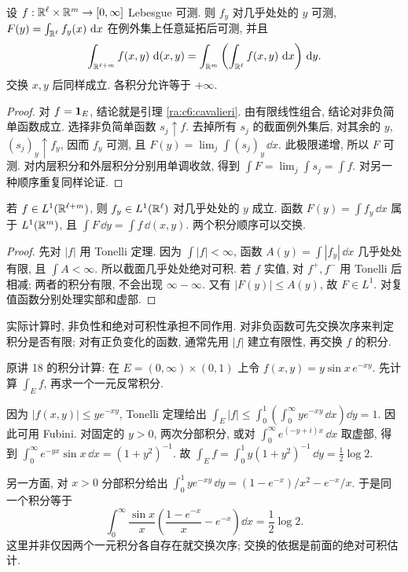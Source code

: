 \begin{theorem}\label{ra:c6:tonelli-euclid}
设 $f:\mathbb R^\ell\times\mathbb R^m\to[0,\infty]$ Lebesgue 可测. 则 $f_y$ 对几乎处处的 $y$ 可测, $F(y)=\int_{\mathbb R^\ell}f_y(x)\,\,\mathrm d x$ 在例外集上任意延拓后可测, 并且
\[
 \int_{\mathbb R^{\ell+m}}f(x,y)\,\,\mathrm d(x,y)
 =\int_{\mathbb R^m}\left(\int_{\mathbb R^\ell}f(x,y)\,\,\mathrm d x\right)\,\mathrm d y.
\]
交换 $x,y$ 后同样成立. 各积分允许等于 $+\infty$.
\end{theorem}
\begin{proof}
对 $f=\mathbf 1_E$, 结论就是引理 \ref{ra:c6:cavalieri}. 由有限线性组合, 结论对非负简单函数成立. 选择非负简单函数 $s_j\uparrow f$. 去掉所有 $s_j$ 的截面例外集后, 对其余的 $y$, $(s_j)_y\uparrow f_y$, 因而 $f_y$ 可测, 且
$F(y)=\lim_j\int(s_j)_y\,\dd x$. 此极限递增, 所以 $F$ 可测. 对内层积分和外层积分分别用单调收敛, 得到 $\int F=\lim_j\int s_j=\int f$. 对另一种顺序重复同样论证.
\end{proof}

\begin{theorem}\label{ra:c6:fubini-euclid}
若 $f\in L^1(\mathbb R^{\ell+m})$, 则 $f_y\in L^1(\mathbb R^\ell)$ 对几乎处处的 $y$ 成立. 函数 $F(y)=\int f_y\,\dd x$ 属于 $L^1(\mathbb R^m)$, 且 $\int F\,\dd y=\int f\,\dd(x,y)$. 两个积分顺序可以交换.
\end{theorem}
\begin{proof}
先对 $|f|$ 用 Tonelli 定理. 因为 $\int|f|<\infty$, 函数 $A(y)=\int|f_y|\,\dd x$ 几乎处处有限, 且 $\int A<\infty$. 所以截面几乎处处绝对可积. 若 $f$ 实值, 对 $f^+,f^-$ 用 Tonelli 后相减; 两者的积分有限, 不会出现 $\infty-\infty$. 又有 $|F(y)|\le A(y)$, 故 $F\in L^1$. 对复值函数分别处理实部和虚部.
\end{proof}

实际计算时, 非负性和绝对可积性承担不同作用. 对非负函数可先交换次序来判定积分是否有限; 对有正负变化的函数, 通常先用 $|f|$ 建立有限性, 再交换 $f$ 的积分.

\begin{example}
原讲 18 的积分计算: 在 $E=(0,\infty)\times(0,1)$ 上令 $f(x,y)=y\sin x\,e^{-xy}$. 先计算 $\int_Ef$, 再求一个一元反常积分.
\end{example}
\begin{solution}
因为 $|f(x,y)|\le ye^{-xy}$, Tonelli 定理给出
$\int_E|f|\le\int_0^1(\int_0^\infty ye^{-xy}\,\dd x)\dd y=1$.
因此可用 Fubini. 对固定的 $y>0$, 两次分部积分, 或对 $\int_0^\infty e^{(-y+i)x}\,\dd x$ 取虚部, 得到 $\int_0^\infty e^{-yx}\sin x\,\dd x=(1+y^2)^{-1}$. 故
$\int_Ef=\int_0^1y(1+y^2)^{-1}\,\dd y=\tfrac12\log2$.

另一方面, 对 $x>0$ 分部积分给出
$\int_0^1ye^{-xy}\,\dd y=(1-e^{-x})/x^2-e^{-x}/x$.
于是同一个积分等于
\[
 \int_0^\infty\frac{\sin x}{x}
 \left(\frac{1-e^{-x}}{x}-e^{-x}\right)\dd x
 =\frac12\log2.
\]
这里并非仅因两个一元积分各自存在就交换次序; 交换的依据是前面的绝对可积估计.
\end{solution}

